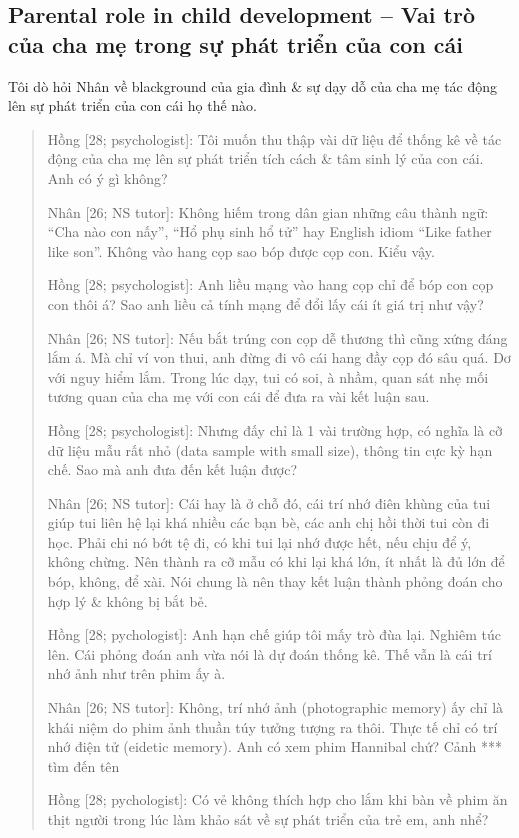 \documentclass[12pt]{article}
\begin{document}
\subsection{Parental role in child development -- Vai trò của cha mẹ trong sự phát triển của con cái}
Tôi dò hỏi Nhân về blackground của gia đình \& sự dạy dỗ của cha mẹ tác động lên sự phát triển của con cái họ thế nào.
\begin{quote}
	{\sf Hồng [28; psychologist]}: Tôi muốn thu thập vài dữ liệu để thống kê về tác động của cha mẹ lên sự phát triển tích cách \& tâm sinh lý của con cái. Anh có ý gì không?

	{\sf Nhân [26; NS tutor]}: Không hiếm trong dân gian những câu thành ngữ: ``Cha nào con nấy'', ``Hổ phụ sinh hổ tử'' hay English idiom ``Like father like son''. Không vào hang cọp sao bóp được cọp con. Kiểu vậy.
	
	{\sf Hồng [28; psychologist]}: Anh liều mạng vào hang cọp chỉ để bóp con cọp con thôi á? Sao anh liều cả tính mạng để đổi lấy cái ít giá trị như vậy?
	
	{\sf Nhân [26; NS tutor]}: Nếu bắt trúng con cọp dễ thương thì cũng xứng đáng lắm á. Mà chỉ ví von thui, anh đừng đi vô cái hang đầy cọp đó sâu quá. Dơ với nguy hiểm lắm. Trong lúc dạy, tui có soi, à nhầm, quan sát nhẹ mối tương quan của cha mẹ với con cái để đưa ra vài kết luận sau.
	
	{\sf Hồng [28; psychologist]}: Nhưng đấy chỉ là 1 vài trường hợp, có nghĩa là cỡ dữ liệu mẫu rất nhỏ (data sample with small size), thông tin cực kỳ hạn chế. Sao mà anh đưa đến kết luận được?
	
	{\sf Nhân [26; NS tutor]}: Cái hay là ở chỗ đó, cái trí nhớ điên khùng của tui giúp tui liên hệ lại khá nhiều các bạn bè, các anh chị hồi thời tui còn đi học. Phải chi nó bớt tệ đi, có khi tui lại nhớ được hết, nếu chịu để ý, không chừng. Nên thành ra cỡ mẫu có khi lại khá lớn, ít nhất là đủ lớn để bóp, không, để xài. Nói chung là nên thay kết luận thành phỏng đoán cho hợp lý \& không bị bắt bẻ.
	
	{\sf Hồng [28; pychologist]}: Anh hạn chế giúp tôi mấy trò đùa lại. Nghiêm túc lên. Cái phỏng đoán anh vừa nói là dự đoán thống kê. Thế vẫn là cái trí nhớ ảnh như trên phim ấy à.
	
	{\sf Nhân [26; NS tutor]}: Không, trí nhớ ảnh (photographic memory) ấy chỉ là khái niệm do phim ảnh thuần túy tưởng tượng ra thôi. Thực tế chỉ có trí nhớ điện tử (eidetic memory). Anh có xem phim Hannibal chứ? Cảnh *** tìm đến tên
	
	{\sf Hồng [28; pychologist]}: Có vẻ không thích hợp cho lắm khi bàn về phim ăn thịt người trong lúc làm khảo sát về sự phát triển của trẻ em, anh nhể?
	

\end{quote}
\end{document}

